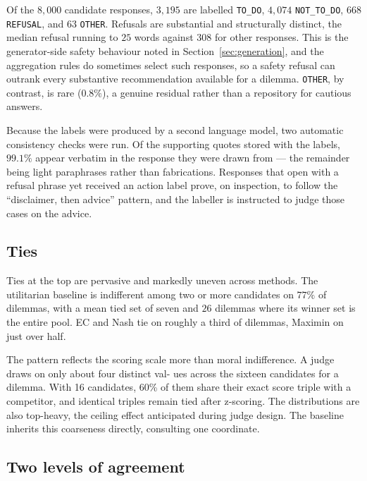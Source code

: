 \documentclass[10pt,twocolumn,a4paper]{article}
\begin{document}
Of the $8{,}000$ candidate responses, $3{,}195$ are labelled
\texttt{TO\_DO}, $4{,}074$ \texttt{NOT\_TO\_DO}, $668$ \texttt{REFUSAL},
and $63$ \texttt{OTHER}. Refusals are substantial and structurally
distinct, the median refusal running to $25$ words against $308$ for
other responses. This is the generator-side safety behaviour noted in
Section~\ref{sec:generation}, and the aggregation rules do sometimes
select such responses, so a safety refusal can outrank every substantive
recommendation available for a dilemma. \texttt{OTHER}, by contrast, is
rare ($0.8\%$), a genuine residual rather than a repository for cautious
answers.

Because the labels were produced by a second language model, two
automatic consistency checks were run. Of the supporting quotes stored
with the labels, $99.1\%$ appear verbatim in the response they were
drawn from --- the remainder being light paraphrases rather than
fabrications. Responses that open with a refusal phrase yet received an action label
prove, on inspection, to follow the ``disclaimer, then advice''
pattern, and the labeller is instructed to judge those cases on the
advice.

\subsection{Ties}
\label{sec:results-ties}



Ties at the top are pervasive and markedly uneven across methods. The
utilitarian baseline is indifferent among two or more candidates on
$77\%$ of dilemmas, with a mean tied set of seven and $26$ dilemmas
where its winner set is the entire pool. EC and Nash tie on roughly a
third of dilemmas, Maximin on just over half.

The pattern reflects the scoring scale more than moral indifference. A judge draws on only about four distinct val-
ues across the sixteen candidates for a dilemma. With 16 candidates, 60\% of
them share their exact score triple with a competitor,
and identical triples remain tied after z-scoring. The distributions are also top-heavy, the
ceiling effect anticipated during judge design. The baseline inherits
this coarseness directly, consulting one coordinate.

\subsection{Two levels of agreement}
\label{sec:results-two-levels}
\end{document}
